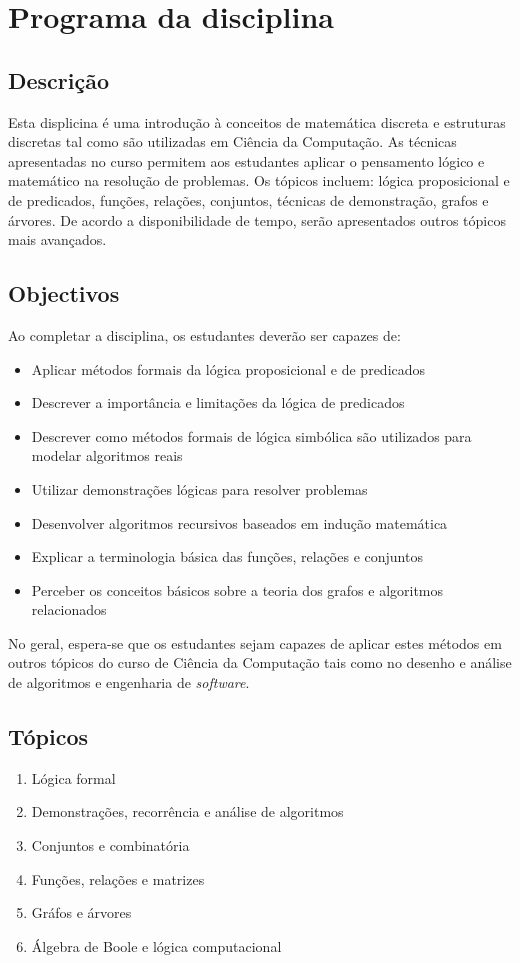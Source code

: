 \chapter*{Programa da disciplina}

\section*{Descrição}

Esta displicina é uma introdução à conceitos de matemática discreta e estruturas
discretas tal como são utilizadas em Ciência da Computação. As técnicas
apresentadas no curso permitem aos estudantes aplicar o pensamento lógico e
matemático na resolução de problemas. Os tópicos incluem: lógica proposicional
e de predicados, funções, relações, conjuntos, técnicas de demonstração, grafos
e árvores. De acordo a disponibilidade de tempo, serão apresentados outros
tópicos mais avançados.

\section*{Objectivos}

Ao completar a disciplina, os estudantes deverão ser capazes de:
\begin{itemize}
  \item Aplicar métodos formais da lógica proposicional e de predicados
  \item Descrever a importância e limitações da lógica de predicados
  \item Descrever como métodos formais de lógica simbólica são utilizados para
  modelar algoritmos reais
  \item Utilizar demonstrações lógicas para resolver problemas
  \item Desenvolver algoritmos recursivos baseados em indução matemática
  \item Explicar a terminologia básica das funções, relações e conjuntos  
  \item Perceber os conceitos básicos sobre a teoria dos grafos e algoritmos relacionados\
\end{itemize} 

No geral, espera-se que os estudantes sejam capazes de aplicar estes métodos em
outros tópicos do curso de Ciência da Computação tais como no desenho e análise
de algoritmos e engenharia de \emph{software}.

\section*{Tópicos}
\begin{enumerate}
  \item Lógica formal
  \item Demonstrações, recorrência e análise de algoritmos
  \item Conjuntos e combinatória
  \item Funções, relações e matrizes
  \item Gráfos e árvores
  \item Álgebra de Boole e lógica computacional
\end{enumerate}

